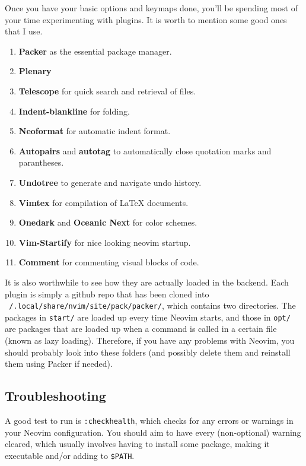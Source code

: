 \documentclass{article}
\begin{document}
    Once you have your basic options and keymaps done, you'll be spending most of your time experimenting with plugins. It is worth to mention some good ones that I use. 
    \begin{enumerate}
      \item \textbf{Packer} as the essential package manager.  
      \item \textbf{Plenary} 
      \item \textbf{Telescope} for quick search and retrieval of files.  
      \item \textbf{Indent-blankline} for folding. 
      \item \textbf{Neoformat} for automatic indent format. 
      \item \textbf{Autopairs} and \textbf{autotag} to automatically close quotation marks and parantheses. 
      \item \textbf{Undotree} to generate and navigate undo history. 
      \item \textbf{Vimtex} for compilation of LaTeX documents. 
      \item \textbf{Onedark} and \textbf{Oceanic Next} for color schemes. 
      \item \textbf{Vim-Startify} for nice looking neovim startup. 
      \item \textbf{Comment} for commenting visual blocks of code. 
    \end{enumerate}

    It is also worthwhile to see how they are actually loaded in the backend. Each plugin is simply a github repo that has been cloned into \texttt{~/.local/share/nvim/site/pack/packer/}, which contains two directories. The packages in \texttt{start/} are loaded up every time Neovim starts, and those in \texttt{opt/} are packages that are loaded up when a command is called in a certain file (known as lazy loading). Therefore, if you have any problems with Neovim, you should probably look into these folders (and possibly delete them and reinstall them using Packer if needed).

  \subsection{Troubleshooting}

    A good test to run is \texttt{:checkhealth}, which checks for any errors or warnings in your Neovim configuration. You should aim to have every (non-optional) warning cleared, which usually involves having to install some package, making it executable and/or adding to \texttt{\$PATH}. 
\end{document}
